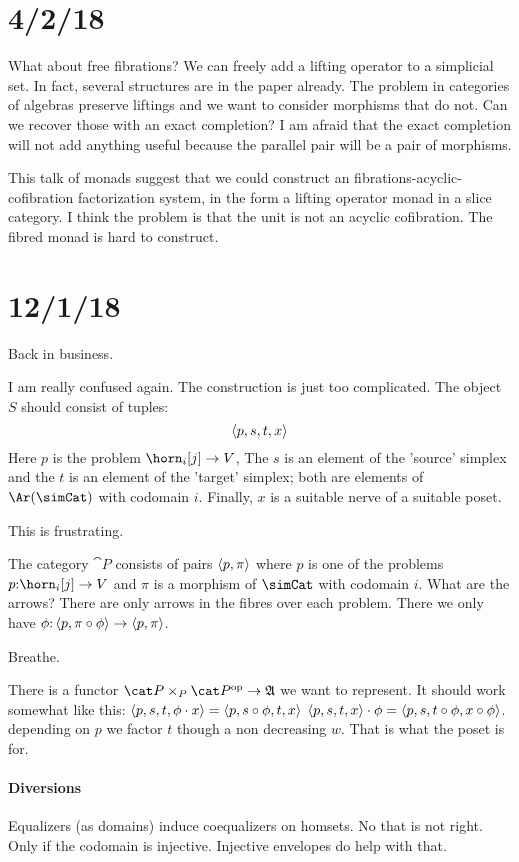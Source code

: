 \documentclass[csh.tex]{subfiles}
\begin{document}
\section{4/2/18}
What about free fibrations?
We can freely add a lifting operator to a simplicial set. In fact, several structures are in the paper already. The problem in categories of algebras preserve liftings and we want to consider morphisms that do not. Can we recover those with an exact completion?
I am afraid that the exact completion will not add anything useful because the parallel pair will be a pair of morphisms.

This talk of monads suggest that we could construct an fibrations-acyclic-cofibration factorization system, in the form a lifting operator monad in a slice category. I think the problem is that the unit is not an acyclic cofibration. The fibred monad is hard to construct.


\section{12/1/18}
Back in business.

I am really confused again. The construction is just too complicated.
The object $S$ should consist of tuples:
\[ \left\langle p,s,t,x \right\rangle \]
Here $p$ is the problem $\horn_i[j]\to V$,
The $s$ is an element of the 'source' simplex and 
the $t$ is an element of the 'target' simplex;
both are elements of $\Ar(\simCat)$ with codomain $i$.
Finally, $x$ is a suitable nerve of a suitable poset.

This is frustrating.

The category $\cat P$ consists of pairs $\left\langle p,\pi \right\rangle$ where $p$ is one of the problems $p\of\horn_i[j]\to V$ and $\pi$ is a morphism of $\simCat$ with codomain $i$. What are the arrows? There are only arrows in the fibres over each problem. There we only have $\phi\mathord :\left\langle p,\pi\circ \phi \right\rangle \to \left\langle p,\pi \right\rangle$.

Breathe.

There is a functor $\cat P\times_P \cat P\dual \to \ambient$ we want to represent. It should work somewhat like this: 
$\left\langle p,s,t,\phi\cdot x \right\rangle = \left\langle p, s\circ \phi, t, x \right\rangle$
$\left\langle p,s,t,x \right\rangle\cdot \phi = \left\langle p, s, t\circ \phi, x\circ \phi \right\rangle$.
depending on $p$ we factor $t$ though a non decreasing $w$.
That is what the poset is for.


\paragraph{Diversions}
Equalizers (as domains) induce coequalizers on homsets. No that is not right. Only if the codomain is injective. Injective envelopes do help with that.
\end{document}
